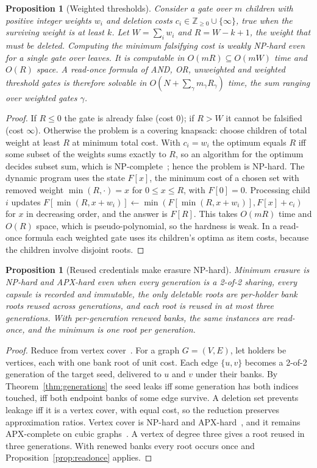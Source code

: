 \documentclass[pdflatex,sn-mathphys-num]{sn-jnl}
\theoremstyle{plain}
\newtheorem{proposition}[theorem]{Proposition}
\theoremstyle{definition}
\begin{document}
\begin{proposition}[Weighted thresholds]\label{prop:weighted}
Consider a gate over $m$ children with positive integer weights $w_i$ and deletion costs $c_i\in\mathbb{Z}_{\ge0}\cup\{\infty\}$, true when the surviving weight is at least $k$. Let $W=\sum_iw_i$ and $R=W-k+1$, the weight that must be deleted. Computing the minimum falsifying cost is weakly NP-hard even for a single gate over leaves. It is computable in $O(mR)\subseteq O(mW)$ time and $O(R)$ space. A read-once formula of AND, OR, unweighted and weighted threshold gates is therefore solvable in $O(N+\sum_{\gamma}m_\gamma R_\gamma)$ time, the sum ranging over weighted gates $\gamma$.
\end{proposition}
\begin{proof}
If $R\le0$ the gate is already false (cost $0$); if $R>W$ it cannot be falsified (cost $\infty$). Otherwise the problem is a covering knapsack: choose children of total weight at least $R$ at minimum total cost. With $c_i=w_i$ the optimum equals $R$ iff some subset of the weights sums exactly to $R$, so an algorithm for the optimum decides subset sum, which is NP-complete~\cite{karp1972}; hence the problem is NP-hard. The dynamic program uses the state $F[x]$, the minimum cost of a chosen set with removed weight $\min(R,\cdot)=x$ for $0\le x\le R$, with $F[0]=0$. Processing child $i$ updates $F[\min(R,x+w_i)]\leftarrow\min(F[\min(R,x+w_i)],F[x]+c_i)$ for $x$ in decreasing order, and the answer is $F[R]$. This takes $O(mR)$ time and $O(R)$ space, which is pseudo-polynomial, so the hardness is weak. In a read-once formula each weighted gate uses its children's optima as item costs, because the children involve disjoint roots.
\end{proof}

\begin{proposition}[Reused credentials make erasure NP-hard]\label{prop:hard}
Minimum erasure is NP-hard and APX-hard even when every generation is a 2-of-2 sharing, every capsule is recorded and immutable, the only deletable roots are per-holder bank roots reused across generations, and each root is reused in at most three generations. With per-generation renewed banks, the same instances are read-once, and the minimum is one root per generation.
\end{proposition}
\begin{proof}
Reduce from vertex cover~\cite{karp1972}. For a graph $G=(V,E)$, let holders be vertices, each with one bank root of unit cost. Each edge $\{u,v\}$ becomes a 2-of-2 generation of the target seed, delivered to $u$ and $v$ under their banks. By Theorem~\ref{thm:generations} the seed leaks iff some generation has both indices touched, iff both endpoint banks of some edge survive. A deletion set prevents leakage iff it is a vertex cover, with equal cost, so the reduction preserves approximation ratios. Vertex cover is NP-hard and APX-hard~\cite{karp1972,dinur2005}, and it remains APX-complete on cubic graphs~\cite{alimonti2000}. A vertex of degree three gives a root reused in three generations. With renewed banks every root occurs once and Proposition~\ref{prop:readonce} applies.
\end{proof}
\end{document}
